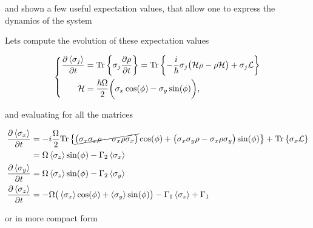   
  \noindent and shown a few useful expectation  values, that allow one to express the dynamics
  of the system
  
  \noindent Lets compute the evolution of these expectation values
  
  \begin{equation}\label{evolution}
    \left\lbrace\begin{aligned} \frac{\partial\left\langle \sigma_j \right\rangle}{\partial t}&=\text{Tr}\left\lbrace\sigma_j \frac{\partial\rho}{\partial t}\right\rbrace = \text{Tr}\left\lbrace-\frac{i}{\hbar}\sigma_j\big(\mathcal{H}\rho - \rho\mathcal{H}\big)+\sigma_j\mathcal{L}\right\rbrace\\
      \mathcal{H}&  = \frac{\hbar\Omega}{2}\bigg(\sigma_x\cos(\phi)-\sigma_y\sin(\phi)\bigg),\end{aligned}\right.
  \end{equation}
  
  \noindent and evaluating for all the matrices
  
  \begin{equation}\label{pauliDeriv}
    \begin{aligned}
       \frac{\partial\left\langle \sigma_x \right\rangle}{\partial t}&=-i\frac{\Omega}{2}\text{Tr}\left\lbrace\cancel{\big(\sigma_x\sigma_x\rho-\sigma_x\rho\sigma_x\big)}\cos(\phi) + \big(\sigma_x\sigma_y\rho-\sigma_x\rho\sigma_y\big)\sin(\phi)\right\rbrace + \text{Tr}\left\lbrace\sigma_x\mathcal{L}\right\rbrace\\
      & = \Omega\left\langle \sigma_z \right\rangle\sin(\phi)-\Gamma_2\left\langle \sigma_x \right\rangle\\
       \frac{\partial\left\langle \sigma_y \right\rangle}{\partial t}& = \Omega\left\langle \sigma_z \right\rangle\sin(\phi)-\Gamma_2\left\langle \sigma_y \right\rangle\\
       \frac{\partial\left\langle \sigma_z \right\rangle}{\partial t}& = -\Omega\big(\left\langle \sigma_x \right\rangle\cos(\phi)+\left\langle \sigma_y \right\rangle\sin(\phi)\big)-\Gamma_1\left\langle \sigma_z \right\rangle+\Gamma_1\\
    \end{aligned}
  \end{equation}
  
  \noindent or in more compact form
  
